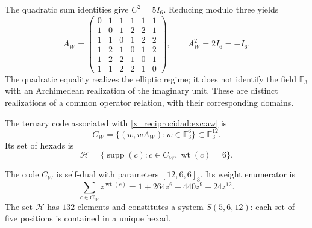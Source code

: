 The quadratic sum identities give $C^2=5I_6$. Reducing modulo
three yields
\begin{equation}
 A_W=
 \begin{pmatrix}
 0&1&1&1&1&1\\
 1&0&1&2&2&1\\
 1&1&0&1&2&2\\
 1&2&1&0&1&2\\
 1&2&2&1&0&1\\
 1&1&2&2&1&0
 \end{pmatrix},
 \qquad A_W^2=2I_6=-I_6.
 \label{x_reciprocidad:exc:aw}
\end{equation}
The quadratic equality realizes the elliptic regime; it does not identify the
field $\mathbb F_3$ with an Archimedean realization of the imaginary
unit. These are distinct realizations of a common operator
relation, with their corresponding domains.

\begin{definition}
\label{x_reciprocidad:exc:codigo}
The ternary code associated with \eqref{x_reciprocidad:exc:aw} is
\[
 C_W=\{(w,wA_W):w\in\mathbb F_3^6\}
       \subset\mathbb F_3^{12}.
\]
Its set of hexads is
\[
 \mathcal H=
 \{\operatorname{supp}(c):c\in C_W,
                           \operatorname{wt}(c)=6\}.
\]
\end{definition}

\begin{proposition}
\label{x_reciprocidad:exc:codigo-witt}
The code $C_W$ is self-dual with parameters $[12,6,6]_3$. Its weight
enumerator is
\begin{equation}
 \sum_{c\in C_W}z^{\operatorname{wt}(c)}
   =1+264z^6+440z^9+24z^{12}.
 \label{x_reciprocidad:exc:enumerador}
\end{equation}
The set $\mathcal H$ has $132$ elements and constitutes a system
$S(5,6,12)$: each set of five positions is contained in a
unique hexad.
\end{proposition}

